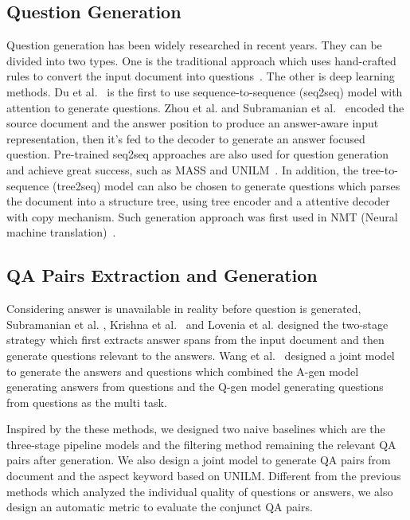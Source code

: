 \subsection{Question Generation}
Question generation has been widely researched in recent years.
They can be divided into two types.
One is the traditional approach which uses hand-crafted rules to convert the input document into questions~\cite{heilman2010good,chali2015towards}.
The other is deep learning methods.
Du et al.~ is the first to use sequence-to-sequence (seq2seq) model with attention to generate questions.
Zhou et al. and Subramanian et al.~ encoded the source document and the answer position to produce an answer-aware input representation, then it's fed to the decoder to generate an answer focused question.
Pre-trained seq2seq approaches are also used for question generation and achieve great success, such as MASS and UNILM~\cite{song2019mass,dong2019unified}.
In addition, the tree-to-sequence (tree2seq) model can also be chosen to generate questions which parses the document into a structure tree, using tree encoder and a attentive decoder with copy mechanism. Such generation approach was first used in NMT (Neural machine translation)~\cite{eriguchi2016tree}.
\subsection{QA Pairs Extraction and Generation}
Considering answer is unavailable in reality before question is generated, Subramanian et al. , Krishna et al.~ and  Lovenia et al.  designed the two-stage strategy which first extracts answer spans from the input document and then generate questions relevant to the answers.
Wang et al.~ designed a joint model to generate the answers and questions which combined the A-gen model generating answers from questions and the Q-gen model generating questions from questions as the multi task. 

Inspired by the these methods, we designed two naive baselines which are the three-stage pipeline models and the filtering method remaining the relevant QA pairs after generation.
We also design a joint model to generate QA pairs from document and the aspect keyword based on UNILM.
Different from the previous methods which analyzed the individual quality of questions or answers, we also design an automatic metric to evaluate the conjunct QA pairs.

